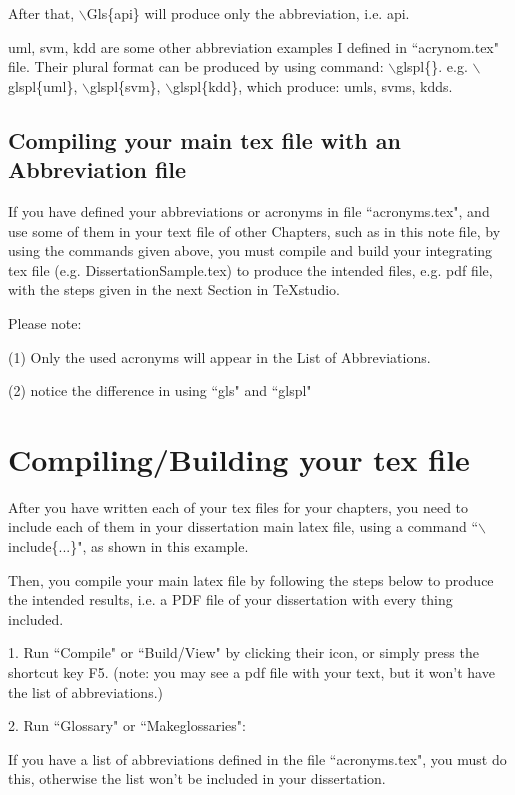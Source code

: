 After that, $\backslash$Gls\{api\} will produce only the abbreviation, i.e. \gls{api}.

\gls{uml}, \gls{svm}, \gls{kdd} are some other abbreviation examples I defined in ``acrynom.tex" file. Their plural format can be produced by using command: $\backslash$glspl\{\}.
 e.g.  $\backslash$glspl\{uml\}, $\backslash$glspl\{svm\},  $\backslash$glspl\{kdd\}, which produce:   
    \glspl{uml}, \glspl{svm}, \glspl{kdd}.  

\subsection{Compiling your main tex file with an Abbreviation file}

If you have defined your abbreviations or acronyms in file ``acronyms.tex", and use some of them in your text file of other Chapters, such as in this note file, by using the commands given above, you must compile and build your integrating tex file (e.g. DissertationSample.tex) to produce the intended files, e.g. pdf file, with the steps given in the next Section in TeXstudio. 

Please note:

(1) Only the used acronyms will appear in the List of Abbreviations.

(2) notice the difference in using ``gls{}" and ``glspl{}"


\section{Compiling/Building your tex file}

After you have written each of your tex files for your chapters, you need to include each of them in your dissertation main latex file, using a command ``$\backslash$include\{...\}",  as shown in this example. 

Then, you compile your main latex file by following the steps below to produce the intended results, i.e. a PDF file of your dissertation with every thing included.   
  
1. Run ``Compile" or ``Build/View" by clicking their icon, or simply press the shortcut key F5.
(note: you may see a pdf file with your text, but it won't have the list of abbreviations.)

2. Run ``Glossary" or ``Makeglossaries": 

If you have a list of abbreviations defined in the file ``acronyms.tex", you must do this, otherwise the list won't be included in your dissertation.
  
